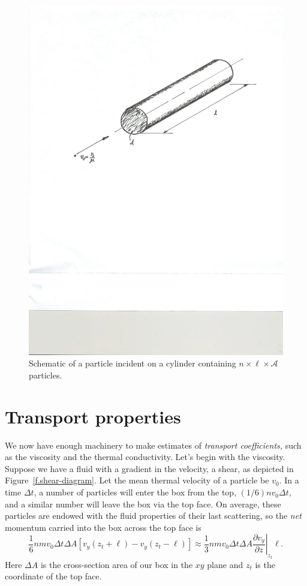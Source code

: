 \begin{figure}[htbp]
\includegraphics[width=\textwidth]{mean-free-path}
\caption{Schematic of a particle incident on a cylinder containing $n\times\ell\times\mathcal{A}$ particles.}
\label{f.mfp}
\end{figure}

\section{Transport properties}

We now have enough machinery to make estimates of \emph{transport coefficients,} such as the viscosity and the thermal conductivity. Let's begin with the viscosity.  Suppose we have a fluid with a gradient in the velocity, a shear, as depicted in Figure~\ref{f.shear-diagram}.  Let the mean thermal velocity of a particle be $v_{0}$.  In a time $\Delta t$, a number of particles will enter the box from the top, $(1/6) n v_{0} \Delta t$, and a similar number will leave the box via the top face. On average, these particles are endowed with the fluid properties of their last scattering, so the \emph{net} momentum carried into the box across the top face is
\begin{equation}\label{e.viscosity-1}
 \frac{1}{6} n m v_{0} \Delta t \Delta A \left[v_{y}(z_{t} + \ell) - v_{y}(z_{t}-\ell)\right] \approx \frac{1}{3} n m v_{0} \Delta t\Delta A \left.\frac{\partial v_{y}}{\partial z}\right|_{z_{t}}\ell.
\end{equation}
Here $\Delta A$ is the cross-section area of our box in the $xy$ plane and $z_{t}$ is the coordinate of the top face.

